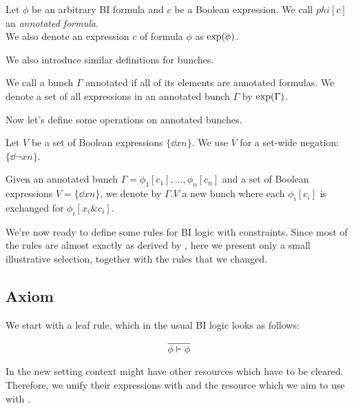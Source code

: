 \begin{definition}
  Let \(\phi\) be an arbitrary BI formula and \(c\) be a Boolean expression.
  We call \(phi[c]\) an \emph{annotated formula}.\\
  We also denote an expression \(c\) of formula \(\phi\) as \(\text{exp}(\phi)\).
\end{definition}

We also introduce similar definitions for bunches.

\begin{definition}
  We call a bunch \(\Gamma\) annotated if all of its elements are annotated formulas.
  We denote a set of all expressions in an annotated bunch \(\Gamma\) by \(\text{exp}(\Gamma)\).
\end{definition}

Now let's define some operations on annotated bunches.

\begin{definition}
  Let \(V\) be a set of Boolean expressions \(\{\dd {x} {n}\}\).
  We use \(\overline{V}\) for a set-wide negation: \(\{\dd {\neg {x}} {n}\}\).
\end{definition}

\begin{definition}
  Given an annotated bunch \(\Gamma = \phi_1[c_1],\ldots,\phi_n[c_n]\) and a set of Boolean expressions \(V = \{\dd {x} {n}\}\), we denote by \(\Gamma . V\) a new bunch where each \(\phi_i[c_i]\) is exchanged for \(\phi_i[x_i \& c_i]\).
\end{definition}

We're now ready to define some rules for BI logic with constraints.
Since most of the rules are almost exactly as derived by \citet{harlandResourceDistributionBooleanConstraints2003}, here we present only a small illustrative selection, together with the rules that we changed.

\subsection{Axiom}

We start with a leaf rule, which in the usual BI logic looks as follows:

\[\infer{\phi \vdash \phi}{}\]

In the new setting context might have other resources which have to be cleared.
Therefore, we unify their expressions with \false and the resource which we aim to use with \true.

